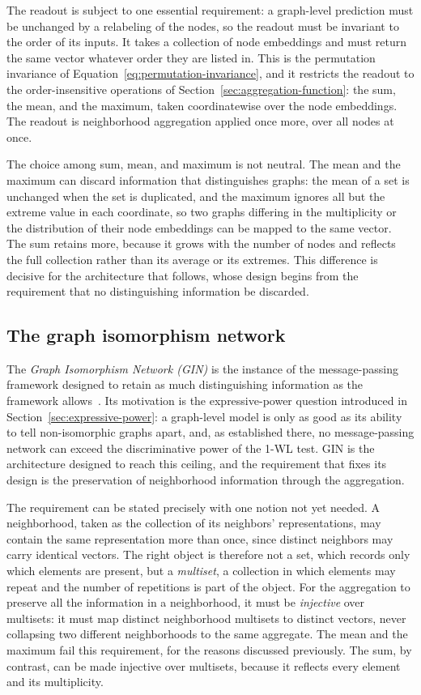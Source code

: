 The readout is subject to one essential requirement:
a graph-level prediction must be unchanged by a
relabeling of the nodes, so the readout must be invariant to the order of its
inputs. It takes a collection of node embeddings and must return the same vector whatever
order they are listed in. This is the permutation invariance of
Equation~\eqref{eq:permutation-invariance},
and it restricts the readout to the order-insensitive
operations of Section~\ref{sec:aggregation-function}: the sum, the mean, and the
maximum, taken coordinatewise over the node embeddings. The readout 
is neighborhood aggregation applied once more, over all nodes at once.

The choice among sum, mean, and maximum is not neutral. The mean
and the maximum can discard information that distinguishes graphs: the mean of a set is
unchanged when the set is duplicated, and the maximum ignores all but the extreme
value in each coordinate, so two graphs differing in the multiplicity or the
distribution of their node embeddings can be mapped to the same vector. The sum
retains more, because it grows with the number of nodes and reflects the full
collection rather than its average or its extremes. This difference is decisive for
the architecture that follows, whose design begins from the requirement that no
distinguishing information be discarded.

\subsection{The graph isomorphism network}
\label{sec:gin}

The \textit{Graph Isomorphism Network (GIN)} is the instance of the 
message-passing framework designed to retain as much distinguishing information 
as the framework allows~\cite{xu2019}. Its motivation is the expressive-power question
introduced in Section~\ref{sec:expressive-power}: a graph-level model is only as good as 
its ability to tell non-isomorphic graphs apart, and, as established there, no
message-passing network can exceed the discriminative power of the \mbox{1-WL} test. 
GIN is the architecture designed to reach this ceiling, and the requirement that fixes its design is 
the preservation of neighborhood information through the aggregation.

The requirement can be stated precisely with one notion not yet needed. A
neighborhood, taken as the collection of its neighbors' representations, may
contain the same representation more than once, since distinct neighbors may carry
identical vectors. The right object is therefore not a set, which records only
which elements are present, but a \textit{multiset}, a collection in which elements
may repeat and the number of repetitions is part of the object. For the aggregation
to preserve all the information in a neighborhood, it must be \textit{injective}
over multisets: it must map distinct neighborhood multisets to distinct vectors,
never collapsing two different neighborhoods to the same aggregate. The mean and
the maximum fail this requirement, for the reasons discussed previously.
The sum, by contrast, can be made injective
over multisets, because it reflects every element and its multiplicity.

